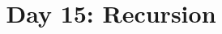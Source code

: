 \documentclass{article}
\begin{document}
\title{Day 15: Recursion}
\author{}
\date{}
\maketitle


\end{document}
